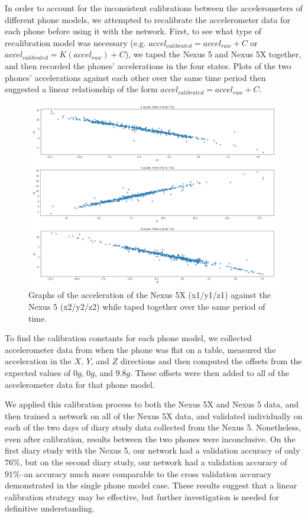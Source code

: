 In order to account for the inconsistent calibrations between the accelerometers of different phone models, we
attempted to recalibrate the accelerometer data for each phone before using it with the network. 
First, to see what type of recalibration model was necessary (e.g. $accel_{calibrated} = accel_{raw} + C$ or
$accel_{calibrated} = K(accel_{raw}) + C$), we taped the Nexus 5 and Nexus 5X together, and then recorded
the phones' accelerations in the four states. Plots of the two phones' accelerations against each other over the same time period
then suggested a linear relationship of the form $accel_{calibrated} = accel_{raw} + C$. 

\begin{figure}[!h]
\center
\includegraphics[scale=0.5]{two_phones}
\caption{Graphs of the acceleration of the Nexus 5X (x1/y1/z1) against the Nexus 5 (x2/y2/z2) while taped together over the same period of time.}
\end{figure}

To find the calibration constants for each phone model, we collected accelerometer
data from when the phone was flat on a table, measured the acceleration in the
$X$, $Y$, and $Z$ directions and then computed the offsets from the expected values of
$0g$, $0g$, and $9.8g$. These offsets were then added to all of the accelerometer data for that phone model.

We applied this calibration process to both the Nexus 5X and Nexus 5 data, and then
trained a network on all of the Nexus 5X data, and validated individually on each of the 
two days of diary study data collected from the Nexus 5.
Nonetheless, even after calibration, results between the two phones were inconclusive. 
On the first diary study with the Nexus 5, our network
had a validation accuracy of only $76\%$, but on the second diary study, our network had a validation
accuracy of $91\%$--an accuracy much more comparable to the cross validation accuracy
demonstrated in the single phone model case. These results suggest that a linear calibration
strategy may be effective, but further investigation is needed for definitive understanding.
